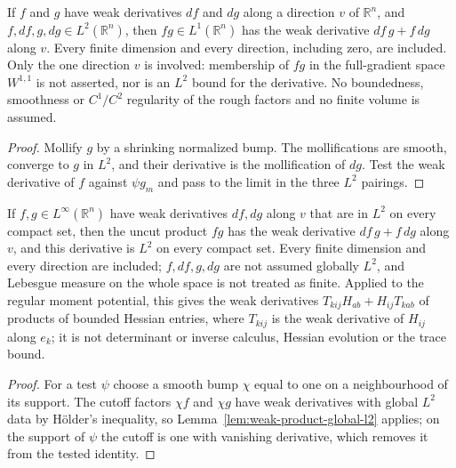 \begin{lemma}
  \label{lem:weak-product-global-l2}
  \leanok
  If $f$ and $g$ have weak derivatives $df$ and $dg$ along a direction $v$ of $\mathbb R^n$, and $f,df,g,dg\in L^2(\mathbb R^n)$,
  then $fg\in L^1(\mathbb R^n)$ has the weak derivative $df\,g+f\,dg$ along $v$. Every finite dimension and every direction,
  including zero, are included. Only the one direction $v$ is involved: membership of $fg$ in the full-gradient space $W^{1,1}$ is
  not asserted, nor is an $L^2$ bound for the derivative. No boundedness, smoothness or $C^1/C^2$ regularity of the rough factors
  and no finite volume is assumed.
\end{lemma}
\begin{proof}
  \leanok
  Mollify $g$ by a shrinking normalized bump. The mollifications are smooth, converge to $g$ in $L^2$, and their derivative is the
  mollification of $dg$. Test the weak derivative of $f$ against $\psi g_m$ and pass to the limit in the three $L^2$ pairings.
\end{proof}

\begin{lemma}
  \label{lem:weak-product-local-bounded}
  \leanok
  If $f,g\in L^\infty(\mathbb R^n)$ have weak derivatives $df,dg$ along $v$ that are in $L^2$ on every compact set, then the uncut
  product $fg$ has the weak derivative $df\,g+f\,dg$ along $v$, and this derivative is $L^2$ on every compact set. Every finite
  dimension and every direction are included; $f,df,g,dg$ are not assumed globally $L^2$, and Lebesgue measure on the whole space
  is not treated as finite. Applied to the regular moment potential, this gives the weak derivatives
  $T_{kij}H_{ab}+H_{ij}T_{kab}$ of products of bounded Hessian entries, where $T_{kij}$ is the weak derivative of $H_{ij}$ along
  $e_k$; it is not determinant or inverse calculus, Hessian evolution or the trace bound.
\end{lemma}
\begin{proof}
  \leanok
  For a test $\psi$ choose a smooth bump $\chi$ equal to one on a neighbourhood of its support. The cutoff factors $\chi f$ and
  $\chi g$ have weak derivatives with global $L^2$ data by H\"older's inequality, so Lemma~\ref{lem:weak-product-global-l2}
  applies; on the support of $\psi$ the cutoff is one with vanishing derivative, which removes it from the tested identity.
\end{proof}


